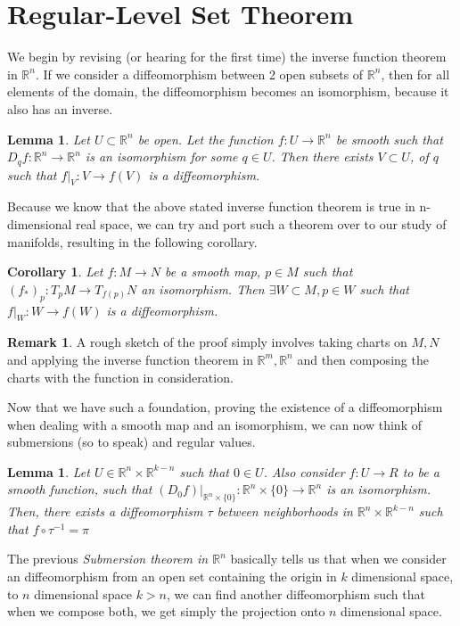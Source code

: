 \documentclass[12pt]{book}
\newtheorem{lemma}[theorem]{Lemma}
\newtheorem{corollary}{Corollary}[theorem]
\theoremstyle{definition}
\newtheorem*{remark}{Remark}
\begin{document}
\section{Regular-Level Set Theorem}
We begin by revising (or hearing for the first time) the inverse function theorem in $\mathbb{R}^n$. If we consider a diffeomorphism between 2 open subsets of $\mathbb{R}^n$, then for all elements of the domain, the diffeomorphism becomes an isomorphism, because it also has an inverse.
\begin{lemma}
    Let $U \subset \mathbb{R}^n$ be open. Let the function $f: U \to \mathbb{R}^n$ be smooth such that $D_q f: \mathbb{R}^n \to \mathbb{R}^n$ is an isomorphism for some $q \in U$. Then there exists $V \subset U$, of $q$ such that $f|_V: V \to f(V)$ is a diffeomorphism.
\end{lemma}
Because we know that the above stated inverse function theorem is true in n-dimensional real space, we can try and port such a theorem over to our study of manifolds, resulting in the following corollary.
\begin{corollary}
    Let $f: M \to N$ be a smooth map, $p \in M$ such that $(f_*)_p: T_pM \to T_{f(p)}N$ an isomorphism. Then $\exists W \subset M, p \in W$ such that $f|_W: W \to f(W)$ is a diffeomorphism.
\end{corollary}
\begin{remark}
    A rough sketch of the proof simply involves taking charts on $M, N$ and applying the inverse function theorem in $\mathbb{R}^m, \mathbb{R}^n$ and then composing the charts with the function in consideration.
\end{remark}
Now that we have such a foundation, proving the existence of a diffeomorphism when dealing with a smooth map and an isomorphism, we can now think of submersions (so to speak) and regular values.
\begin{lemma}
    Let $U \in \mathbb{R}^n \times \mathbb{R}^{k-n}$ such that $ 0 \in U$. Also consider $f: U \to R$ to be a smooth function, such that $(D_0 f)|_{\mathbb{R}^n \times \{0\}}: \mathbb{R}^n \times \{0\} \to \mathbb{R}^n$ is an isomorphism. Then, there exists a diffeomorphism $\tau$ between neighborhoods in $\mathbb{R}^n \times \mathbb{R}^{k-n}$ such that $f \circ \tau^{-1} = \pi$
\end{lemma}
The previous \textit{Submersion theorem in $\mathbb{R}^n$} basically tells us that when we consider an diffeomorphism from an open set containing the origin in $k$ dimensional space, to $n$ dimensional space $k > n$, we can find another diffeomorphism such that when we compose both, we get simply the projection onto $n$ dimensional space.
\end{document}
